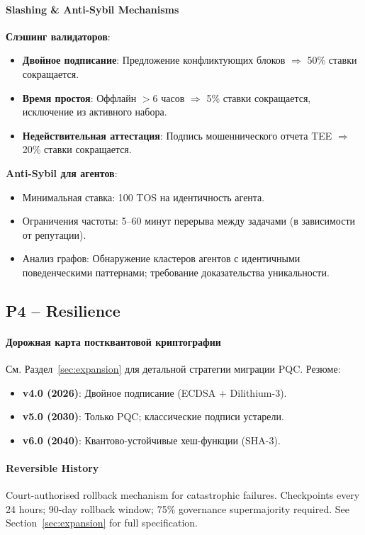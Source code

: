 \documentclass[11pt]{article}
\begin{document}
\paragraph{Slashing \& Anti-Sybil Mechanisms}
\textbf{Слэшинг валидаторов}:
\begin{itemize}[noitemsep]
  \item \textbf{Двойное подписание}: Предложение конфликтующих блоков $\Rightarrow$ 50\% ставки сокращается.
  \item \textbf{Время простоя}: Оффлайн $>$6 часов $\Rightarrow$ 5\% ставки сокращается, исключение из активного набора.
  \item \textbf{Недействительная аттестация}: Подпись мошеннического отчета TEE $\Rightarrow$ 20\% ставки сокращается.
\end{itemize}

\textbf{Anti-Sybil для агентов}:
\begin{itemize}[noitemsep]
  \item Минимальная ставка: 100 TOS на идентичность агента.
  \item Ограничения частоты: 5--60 минут перерыва между задачами (в зависимости от репутации).
  \item Анализ графов: Обнаружение кластеров агентов с идентичными поведенческими паттернами; требование доказательства уникальности.
\end{itemize}

\subsection{P4 -- Resilience}
\label{sec:pillar-resilience}

\paragraph{Дорожная карта постквантовой криптографии}
См. Раздел~\ref{sec:expansion} для детальной стратегии миграции PQC. Резюме:
\begin{itemize}[noitemsep]
  \item \textbf{v4.0 (2026)}: Двойное подписание (ECDSA + Dilithium-3).
  \item \textbf{v5.0 (2030)}: Только PQC; классические подписи устарели.
  \item \textbf{v6.0 (2040)}: Квантово-устойчивые хеш-функции (SHA-3).
\end{itemize}

\paragraph{Reversible History}
Court-authorised rollback mechanism for catastrophic failures. Checkpoints every 24 hours; 90-day rollback window; 75\% governance supermajority required. See Section~\ref{sec:expansion} for full specification.
\end{document}
